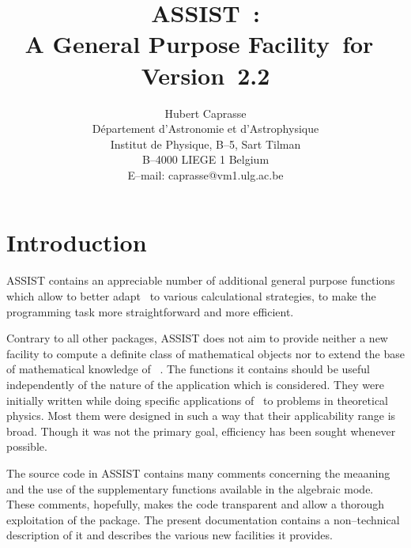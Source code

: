 \newcommand{\nl}{\hfill\newline}
\newcommand{\bq}{\begin{quotation}}
\newcommand{\eq}{\end{quotation}}
\newcommand{\bi}{\begin{itemize}}
\newcommand{\ei}{\end{itemize}}
\date{}
\title{{\bf ASSIST}\ :\\[2pt]
 A General Purpose Facility~for~\REDUCE \\[5pt]
       \mbox{\hfill Version 2.2\hfil}}
\author{Hubert Caprasse \\
D\'epartement d'Astronomie et d'Astrophysique \\
Institut de Physique, B--5, Sart Tilman \\
B--4000 LIEGE 1
Belgium\\[3pt]
E--mail: caprasse@vm1.ulg.ac.be}

\maketitle
{}
\section{Introduction}
 ASSIST contains
an appreciable number of additional general purpose functions which allow
to better adapt \REDUCE\  to various calculational strategies,
to make the  programming task more straightforward and more efficient.

Contrary to all other packages, ASSIST does not aim to provide neither a new
facility to compute a definite class of mathematical objects nor to extend
the  base of mathematical knowledge of \REDUCE\ .
The functions it contains should be
useful independently of the nature of the application which is considered.
They were initially written while doing specific applications of
\REDUCE\  to problems in theoretical physics. Most them were designed
in  such a way that their applicability range is broad. Though it was not
the primary goal, efficiency has been sought whenever possible.

The source code in ASSIST contains many comments concerning
the meaaning and the use of the supplementary functions available
in the algebraic mode. These comments, hopefully, makes the code transparent
and allow a thorough exploitation of the package. The present documentation
contains a non--technical description of it and describes the
various new facilities it provides.
